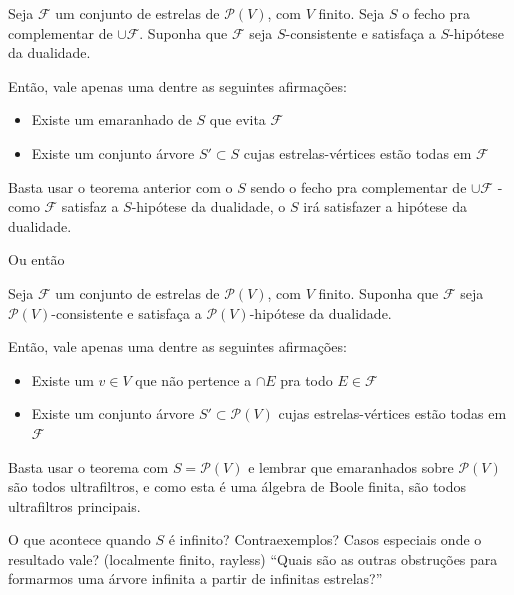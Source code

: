 \begin{teorema*}
  Seja $\mathcal{F}$ um conjunto de estrelas de $\mathcal{P}(V)$, com $V$ finito. Seja $S$ o fecho pra complementar de $\cup \mathcal{F}$. Suponha que $\mathcal{F}$ seja $S$-consistente e satisfaça a $S$-hipótese da dualidade.

  Então, vale apenas uma dentre as seguintes afirmações:

\begin{itemize}[label=]
  \item Existe um emaranhado de $S$ que evita $\mathcal{F}$
  \item Existe um conjunto árvore $S' \subset S$ cujas estrelas-vértices estão todas em $\mathcal{F}$
\end{itemize}
  \end{teorema*}
  \begin{prova}
    Basta usar o teorema anterior com o $S$ sendo o fecho pra complementar de $\cup \mathcal{F}$ - como $\mathcal{F}$ satisfaz a $S$-hipótese da dualidade, o $S$ irá satisfazer a hipótese da dualidade.
  \end{prova}

  Ou então

  \begin{teorema*}
  Seja $\mathcal{F}$ um conjunto de estrelas de $\mathcal{P}(V)$, com $V$ finito. Suponha que $\mathcal{F}$ seja $\mathcal{P}(V)$-consistente e satisfaça a $\mathcal{P}(V)$-hipótese da dualidade.

  Então, vale apenas uma dentre as seguintes afirmações:

\begin{itemize}[label=]
  \item Existe um $v \in V$ que não pertence a $\cap E$ pra todo $E \in \mathcal{F}$
  \item Existe um conjunto árvore $S' \subset \mathcal{P}(V)$ cujas estrelas-vértices estão todas em $\mathcal{F}$
\end{itemize}
  \end{teorema*}
  \begin{prova}
    Basta usar o teorema com $S = \mathcal{P}(V)$ e lembrar que emaranhados sobre $\mathcal{P}(V)$ são todos ultrafiltros, e como esta é uma álgebra de Boole finita, são todos ultrafiltros principais.
  \end{prova}

  \begin{pergunta}
    O que acontece quando $S$ é infinito? Contraexemplos? Casos especiais onde o resultado vale? (localmente finito, rayless) ``Quais são as outras obstruções para formarmos uma árvore infinita a partir de infinitas estrelas?''
  \end{pergunta}

